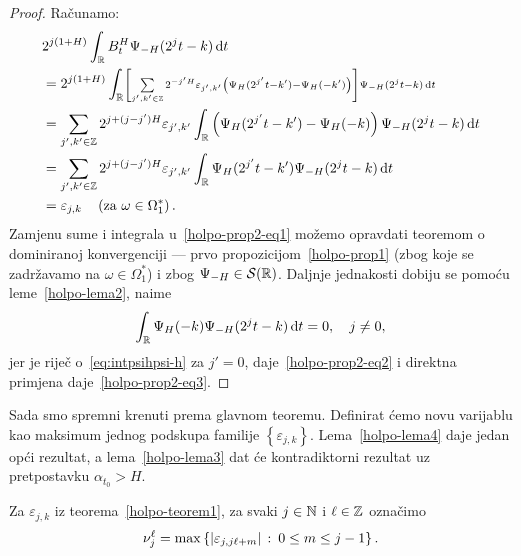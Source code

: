 \documentclass[main.tex]{subfiles}
\begin{document}
\newcommand{\grn}{_\R}
\begin{proof}
	Računamo:
	\begin{align}
		 & 2^{j(1+H)}\int\grn B^H_t\Psi_{-H}(2^jt-k) \D t                                                                                                                                                     \\
		 & = 2^{j(1+H)}\int\grn  \scriptstyle \left[ \sum\limits_{j',k'\in\Z} 2^{-j'H}\varepsilon_{j',k'}\left( \Psi_H(2^{j'}t-k')-\Psi_H(-k') \right) \right] \Psi_{-H}(2^jt-k) \D t \label{holpo-prop2-eq1} \\
		 & = \sum_{j',k'\in\Z} 2^{j+(j-j')H}\varepsilon_{j',k'}
		\int\grn \left( \Psi_H(2^{j'}t-k')-\Psi_H(-k) \right)\Psi_{-H}(2^jt-k) \D t                                                                                                                           \\
		 & = \sum_{j',k'\in\Z} 2^{j+(j-j')H}\varepsilon_{j',k'}
		\int\grn \Psi_H(2^{j'}t-k')\Psi_{-H}(2^jt-k) \D t \label{holpo-prop2-eq2}                                                                                                                             \\
		 & = \varepsilon_{j,k} \quad \left(\text{za } \omega \in \Omega_1^*\right). \label{holpo-prop2-eq3}
	\end{align}
	Zamjenu sume i integrala u~\eqref{holpo-prop2-eq1} možemo opravdati teoremom o
	dominiranoj konvergenciji --- prvo propozicijom~\ref{holpo-prop1}
	(zbog koje se zadržavamo na \( \omega \in \Omega_1^* \)) i zbog \( \Psi_{-H} \in \mathcal S(\mathbb{R}) \).
	Daljnje jednakosti dobiju se pomoću leme~\ref{holpo-lema2}, naime
	\begin{equation}
		\int\grn \Psi_H(-k)\Psi_{-H}(2^jt-k) \D t = 0, \quad j \neq 0,
	\end{equation}
	jer je riječ o~\eqref{eq:intpsihpsi-h} za \( j'=0 \), daje~\eqref{holpo-prop2-eq2} i direktna primjena daje~\eqref{holpo-prop2-eq3}.
\end{proof}

Sada smo spremni krenuti prema glavnom teoremu.
Definirat ćemo novu varijablu kao maksimum
jednog podskupa familije \( \left\{ \varepsilon_{j,k} \right\} \).
Lema~\ref{holpo-lema4} daje jedan opći rezultat,
a lema~\ref{holpo-lema3} dat će kontradiktorni rezultat
uz pretpostavku \( \alpha_{t_0} > H \).

\begin{definicija}
	Za \( \varepsilon_{j,k} \) iz teorema~\ref{holpo-teorem1}, za svaki \( j \in \mathbb{N} \)
	i \( \ell \in \mathbb{Z} \) označimo
	\begin{equation}
		\nu_j^\ell = \max\left\{ \left| {\varepsilon_{j, j\ell+m}} \right| \, \colon \, 0 \le m \le j-1 \right\}.
	\end{equation}
\end{definicija}
\end{document}
